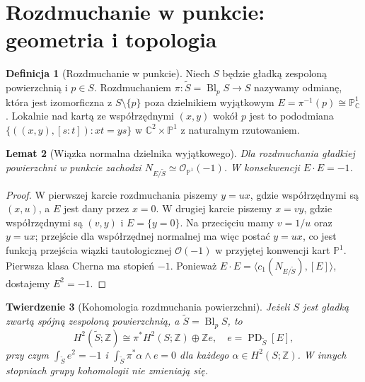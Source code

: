 \documentclass[11pt,a4paper,oneside]{report}
\newcommand{\C}{\mathbb{C}}
\newcommand{\Z}{\mathbb{Z}}
\theoremstyle{plain}
\newtheorem{twierdzenie}{Twierdzenie}[section]
\newtheorem{lemat}[twierdzenie]{Lemat}
\theoremstyle{definition}
\newtheorem{definicja}[twierdzenie]{Definicja}
\theoremstyle{remark}
\begin{document}
\section{Rozdmuchanie w punkcie: geometria i topologia}
\begin{definicja}[Rozdmuchanie w punkcie]
Niech $S$ będzie gładką zespoloną powierzchnią i $p\in S$.
Rozdmuchaniem $\pi:\widetilde S=\operatorname{Bl}_pS\to S$
nazywamy odmianę, która jest izomorficzna z $S\setminus\{p\}$
poza dzielnikiem wyjątkowym $E=\pi^{-1}(p)\cong\mathbb P^1_\C$.
Lokalnie nad kartą ze współrzędnymi $(x,y)$ wokół $p$ jest to
pododmiana $\{((x,y),[s:t]):xt=ys\}$ w
$\C^2\times\mathbb P^1$ z naturalnym rzutowaniem.
\end{definicja}
\begin{lemat}[Wiązka normalna dzielnika wyjątkowego]
\label{lem:xvii-exceptional}
Dla rozdmuchania gładkiej powierzchni w punkcie zachodzi
$N_{E/\widetilde S}\simeq\mathcal O_{\mathbb P^1}(-1)$.
W konsekwencji $E\cdot E=-1$.
\end{lemat}
\begin{proof}
W pierwszej karcie rozdmuchania piszemy $y=ux$,
gdzie współrzędnymi są $(x,u)$, a $E$ jest dany przez $x=0$.
W drugiej karcie piszemy $x=vy$, gdzie współrzędnymi są
$(v,y)$ i $E=\{y=0\}$. Na przecięciu mamy $v=1/u$
oraz $y=ux$; przejście dla współrzędnej normalnej
ma więc postać $y=ux$, co jest funkcją przejścia
wiązki tautologicznej $\mathcal O(-1)$ w przyjętej konwencji
kart $\mathbb P^1$. Pierwsza klasa Cherna ma stopień $-1$.
Ponieważ $E\cdot E=\langle c_1(N_{E/\widetilde S}),[E]\rangle$,
dostajemy $E^2=-1$.
\end{proof}
\begin{twierdzenie}[Kohomologia rozdmuchania powierzchni]
\label{thm:xvii-blowup}
Jeżeli $S$ jest gładką zwartą spójną zespoloną powierzchnią,
a $\widetilde S=\operatorname{Bl}_pS$, to
\[
H^2(\widetilde S;\Z)\cong \pi^*H^2(S;\Z)\oplus\Z e,
\quad e=\operatorname{PD}_{\widetilde S}[E],
\]
przy czym $\int_{\widetilde S}e^2=-1$ i
$\int_{\widetilde S}\pi^*\alpha\wedge e=0$
dla każdego $\alpha\in H^2(S;\Z)$.
W innych stopniach grupy kohomologii nie zmieniają się.
\end{twierdzenie}
\end{document}

